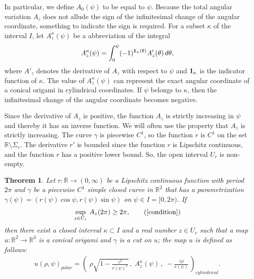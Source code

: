 \documentclass{amsart}
\theoremstyle{plain}
\newtheorem{theorem}{Theorem}[section]
\theoremstyle{definition}
\theoremstyle{remark}
\begin{document}
In particular, we define $A_0(\psi)$ to be equal to $\psi$.
Because the total angular variation $A_z$ does not allude the sign of the infinitesimal change of the angular coordinate, something to indicate the sign is required.
For a subset $\kappa$ of the interval $I$, let $A_z^{\kappa}(\psi)$ be a abbreviation of the integral
\begin{align*}
A_z^{\kappa}(\psi)=\int_0^{\psi}(-1)^{\bold{1}_{\kappa}(\theta)}A'_z(\theta)\,d\theta,
\end{align*}
where $A'_z$ denotes the derivative of $A_z$ with respect to $\psi$ and $\bold{1}_{\kappa}$ is the indicator function of $\kappa$.
The value of $A_z^{\kappa}(\psi)$ can represent the exact angular coordinate of a conical origami in cylindrical coordinates.
If $\psi$ belongs to $\kappa$, then the infinitesimal change of the angular coordinate becomes negative. 

Since the derivative of $A_z$ is positive, the function $A_z$ is strictly increasing in $\psi$ and thereby it has an inverse function.
We will often use the property that $A_z$ is strictly increasing.
The curve $\gamma$ is piecewise $C^1$, so the function $r$ is $C^1$ on the set $\mathbb{R}\setminus\Sigma_r$.
The derivative $r'$ is bounded since the function $r$ is Lipschitz continuous, and the function $r$ has a positive lower bound.
So, the open interval $U_r$ is non-empty.




\begin{theorem}\label{3.1} %
Let $r \colon \mathbb{R}\to(0,\infty)$ be a Lipschitz continuous function with period $2\pi$ and $\gamma$ be a piecewise $C^1$ simple closed curve in $\mathbb{R}^2$ that has a parametrization $\gamma(\psi)=(r(\psi)\cos\psi,r(\psi)\sin\psi)$ on $\psi\in I=[0,2\pi)$.  
If
\begin{align*}
\sup_{z\in U_r}\,A_z(2\pi)\ge2\pi, \tag{\ref{condition}}
\end{align*}
then there exist a closed interval $\kappa\subset I$ and a real number $z\in U_r$ such that a map $u \colon \mathbb{R}^2\to\mathbb{R}^3$ is a conical origami and $\gamma$ is a cut on $u$;
the map $u$ is defined as follows:
\begin{align}\label{origami}%
u(\rho,\psi)_{polar}=\left(\;\rho\sqrt{1-\frac{z^2}{r(\psi)^2}}\,,
\;A_z^{\kappa}(\psi)\,,
\;-\frac{z\rho}{r(\psi)}\,\right)_{cylindrical}. %
\end{align}
\end{theorem}
\end{document}
